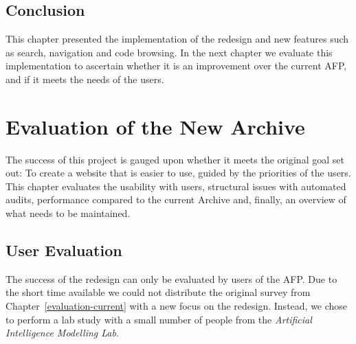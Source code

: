 \documentclass[bsc,frontabs,oneside,singlespacing,parskip,deptreport,logo]{infthesis}
\begin{document}
\section{Conclusion}


This chapter presented the implementation of the redesign and new features such as search, navigation and code browsing. In the next chapter we evaluate this implementation to ascertain whether it is an improvement over the current AFP, and if it meets the needs of the users.



\chapter{Evaluation of the New Archive} \label{redesign-evaluation}

The success of this project is gauged upon whether it meets the original goal set out: To create a website that is easier to use, guided by the priorities of the users. This chapter evaluates the usability with users, structural issues with automated audits, performance compared to the current Archive and, finally, an overview of what needs to be maintained. 

\section{User Evaluation}


The success of the redesign can only be evaluated by users of the AFP. Due to the short time available we could not distribute the  original survey from Chapter~\ref{evaluation-current} with a new focus on the redesign. Instead, we chose to perform a lab study with a small number of people from the \textit{Artificial Intelligence Modelling Lab}. 
\end{document}
